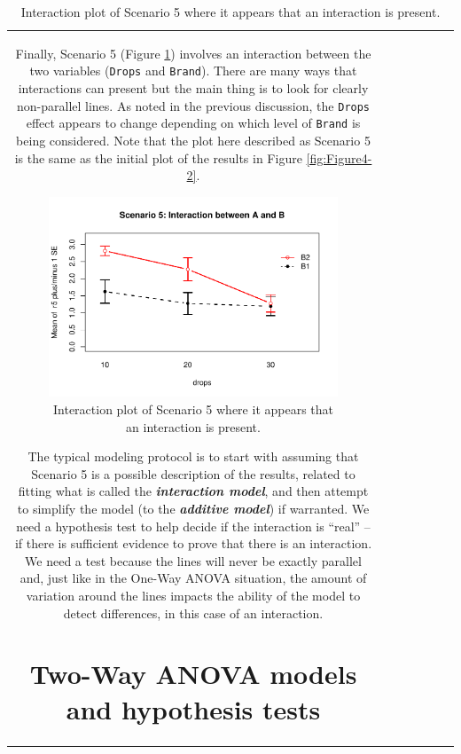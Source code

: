 \documentclass[]{book}
\theoremstyle{definition}
\theoremstyle{definition}
\theoremstyle{remark}
\begin{document}
\begin{longtable}[]{@{}ccccccc@{}}
\begin{minipage}[b]{0.10\columnwidth}
Finally, Scenario 5 (Figure \ref{fig:Figure4-5}) involves an interaction
between the two variables (\texttt{Drops} and \texttt{Brand}). There are
many ways that interactions can present but the main thing is to look
for clearly non-parallel lines. As noted in the previous discussion, the
\texttt{Drops} effect appears to change depending on which level of
\texttt{Brand} is being considered. Note that the plot here described as
Scenario 5 is the same as the initial plot of the results in Figure
\ref{fig:Figure4-2}.




\begin{figure}
\centering
\includegraphics{04-twoWayAnova_files/figure-latex/Figure4-5-1.pdf}
\caption{\label{fig:Figure4-5}Interaction plot of Scenario 5 where it appears that an
interaction is present.}
\end{figure}

The typical modeling protocol is to start with assuming that Scenario 5
is a possible description of the results, related to fitting what is
called the \textbf{\emph{interaction model}}, and then attempt to
simplify the model (to the \textbf{\emph{additive model}}) if warranted.
We need a hypothesis test to help decide if the interaction is ``real''
-- if there is sufficient evidence to prove that there is an
interaction. We need a test because the lines will never be exactly
parallel and, just like in the One-Way ANOVA situation, the amount of
variation around the lines impacts the ability of the model to detect
differences, in this case of an interaction.

\section{Two-Way ANOVA models and hypothesis tests}\label{section4-3}


\end{minipage}
\end{longtable}
\end{document}

